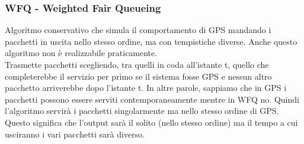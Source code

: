 \documentclass{article}
\begin{document}
\subsubsection{WFQ - Weighted Fair Queueing}
Algoritmo conservativo che simula il comportamento di GPS mandando i pacchetti in uscita nello stesso ordine, ma con tempistiche diverse. Anche questo algoritmo non è realizzabile praticamente.\\
Trasmette pacchetti scegliendo, tra quelli in coda all'istante t, quello che completerebbe il servizio per primo se il sistema fosse GPS e nessun altro pacchetto arriverebbe dopo l'istante t. In altre parole, sappiamo che in GPS i pacchetti possono essere serviti contemporaneamente mentre in WFQ no. Quindi l'algoritmo servirà i pacchetti singolarmente ma nello stesso ordine di GPS. Questo significa che l'output sarà il solito (nello stesso ordine) ma il tempo a cui usciranno i vari pacchetti sarà diverso.
\end{document}
